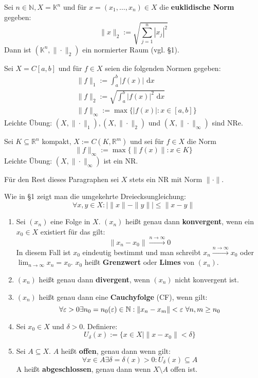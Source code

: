 \documentclass[a4paper,twoside,DIV15,BCOR12mm,chapterprefix=true,headings=twolinechapter]{scrbook}
\begin{document}
\begin{beispiele}
\item Sei $n\in\mathbb{N},X=\mathbb{K}^n$ und für $x=(x_1,\ldots,x_n)\in X$
die \textbf{euklidische Norm} gegeben:
\[\|x\|_2:=\sqrt{\sum_{j=1}^n |x_j|^2}\]
Dann ist $(\mathbb{K}^n,\|\cdot\|_2)$ ein normierter Raum (vgl. §1).
\item Sei $X=C[a,b]$ und für $f\in X$ seien die folgenden Normen gegeben:
\begin{align*}
&\|f\|_1:=\int_a^b|f(x)|\text{ d}x\\
&\|f\|_2:=\sqrt{\int_a^b|f(x)|^2\text{ d}x}\\
&\|f\|_\infty:=\max\{|f(x)|:x\in[a,b]\}
\end{align*}
Leichte Übung: $(X,\|\cdot\|_1),(X,\|\cdot\|_2)$ und $(X,\|\cdot\|_\infty)$
sind NRe.
\item Sei $K\subseteq \mathbb{R}^n$ kompakt, $X:=C(K,\mathbb{R}^m)$ und sei für
$f\in X$ die Norm
\[\|f\|_\infty:=\max\{\|f(x)\|:x\in K\}\]
Leichte Übung: $(X,\|\cdot\|_\infty)$ ist ein NR.
\end{beispiele}

Für den Rest dieses Paragraphen sei $X$ stets ein NR mit Norm $\|\cdot\|$.

\begin{bemerkung}
Wie in §1 zeigt man die umgekehrte Dreiecksungleichung:
\[\forall x,y\in X:|\|x\|-\|y\||\le\|x-y\|\]
\end{bemerkung}

\begin{definition}
\begin{enumerate}
\item Sei $(x_n)$ eine Folge in $X$. $(x_n)$ heißt genau dann \textbf{konvergent},
wenn ein $x_0\in X$ existiert für das gilt:
\[\|x_n-x_0\|\stackrel{n\to\infty}\to 0\]
In diesem Fall ist $x_0$ eindeutig bestimmt und man schreibt $x_n\stackrel{n\to\infty}\to x_0$
oder $\lim_{n\to\infty} x_n=x_0$. $x_0$ heißt \textbf{Grenzwert} oder \textbf{Limes}
von $(x_n)$.
\item $(x_n)$ heißt genau dann \textbf{divergent}, wenn $(x_n)$ nicht konvergent ist.
\item $(x_n)$ heißt genau dann eine \textbf{Cauchyfolge} (CF), wenn gilt:
\[\forall\varepsilon>0 \exists n_0=n_0(\varepsilon)\in\mathbb{N}:\|x_n-x_m\|<\varepsilon\ \forall n,m\ge n_0\]
\item Sei $x_0\in X$ und $\delta>0$. Definiere:
\[U_\delta(x):=\{x\in X\mid \|x-x_0\|<\delta\}\]
\item Sei $A\subseteq X$. $A$ heißt \textbf{offen}, genau dann wenn gilt:
\[\forall x\in A\exists \delta=\delta(x)>0: U_\delta(x)\subseteq A\]
A heißt \textbf{abgeschlossen}, genau dann wenn $X\setminus A$ offen ist.
\end{enumerate}
\end{definition}
\end{document}
